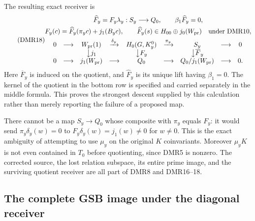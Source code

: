 The resulting exact receiver is
\begin{equation}\tag{DMR18}
\begin{gathered}
\widehat F_y=F_y\lambda_y:S_y\longrightarrow Q_0,
\qquad \beta_1\widehat F_y=0,\\
F_y(c)=\widehat F_y(\pi_yc)+j_1(B_yc),\qquad
\widehat F_y(s)\in H_{00}\oplus j_0(W_{\rm pr})
                    \quad\hbox{under DMR10},\\
\begin{array}{ccccccccc}
0&\longrightarrow&W_{\rm pr}(1)&\xrightarrow{\delta_y}&
 H_0(G,K_y^0)&\xrightarrow{\pi_y}&S_y&\longrightarrow&0\\
&&\big\downarrow j_1&&\big\downarrow F_y&&\big\downarrow\overline F_y\\
0&\longrightarrow&j_1(W_{\rm pr})&\longrightarrow&Q_0
 &\longrightarrow&Q_0/j_1(W_{\rm pr})&\longrightarrow&0.
\end{array}
\end{gathered}
\end{equation}
Here $\overline F_y$ is induced on the quotient, and
$\widehat F_y$ is its unique lift having $\beta_1=0$.
The kernel of the quotient in the bottom row is specified and
carried separately in the middle formula. This proves the
strongest descent supplied by this calculation rather than
merely reporting the failure of a proposed map.

There cannot be a map $S_y\to Q_0$ whose composite with
$\pi_y$ equals $F_y$: it would send $\pi_y\delta_y(w)=0$ to
$F_y\delta_y(w)=j_1(w)\ne0$ for $w\ne0$.
This is the exact ambiguity of attempting to use $\mu_y$ on
the original $K$ coinvariants. Moreover $\mu_yK$ is not even
contained in $T_0$ before quotienting, since DMR5 is nonzero.
The corrected source, the lost relation subspace, its entire
prime image, and the surviving quotient receiver are all part
of DMR8 and DMR16--18.

\subsection{The complete GSB image under the diagonal receiver}

